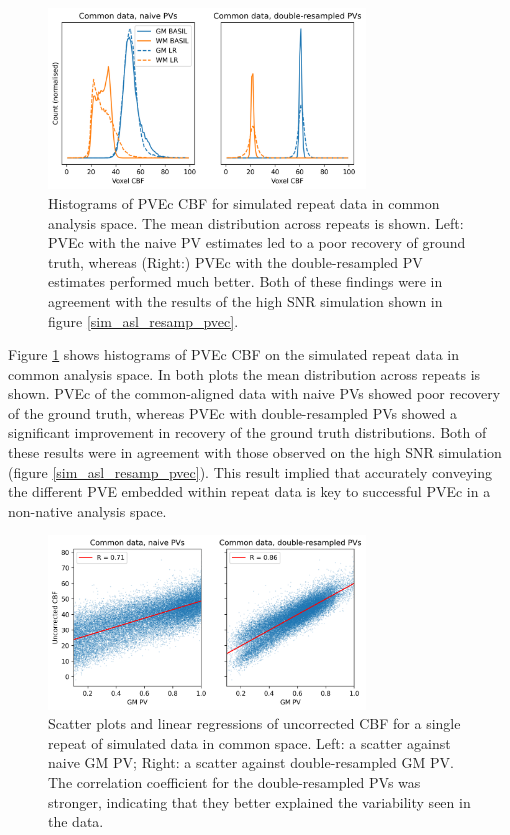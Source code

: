 \documentclass[12pt]{report}
\begin{document}
\begin{figure}[H]
\centering
\includegraphics[width = 0.75\textwidth]{sim_rpts_resamp_pvec.png}
\caption{Histograms of PVEc CBF for simulated repeat data in common analysis space. The mean distribution across repeats is shown. Left: PVEc with the naive PV estimates led to a poor recovery of ground truth, whereas (Right:) PVEc with the double-resampled PV estimates performed much better. Both of these findings were in agreement with the results of the high SNR simulation shown in figure \ref{sim_asl_resamp_pvec}.}
\label{sim_rpts_resamp_pvec}
\end{figure}

Figure \ref{sim_rpts_resamp_pvec} shows histograms of PVEc CBF on the simulated repeat data in common analysis space. In both plots the mean distribution across repeats is shown. PVEc of the common-aligned data with naive PVs showed poor recovery of the ground truth, whereas PVEc with double-resampled PVs showed a significant improvement in recovery of the ground truth distributions. Both of these results were in agreement with those observed on the high SNR simulation (figure \ref{sim_asl_resamp_pvec}). This result implied that accurately conveying the different PVE embedded within repeat data is key to successful PVEc in a non-native analysis space.  

\begin{figure}[H]
\centering
\includegraphics[width = 0.75\textwidth]{sim_rpts_resamp_scatter.png}
\caption{Scatter plots and linear regressions of uncorrected CBF for a single repeat of simulated data in common space. Left: a scatter against naive GM PV; Right: a scatter against double-resampled GM PV. The correlation coefficient for the double-resampled PVs was stronger, indicating that they better explained the variability seen in the data.}
\label{sim_rpts_resamp_scatter}
\end{figure}
\end{document}

